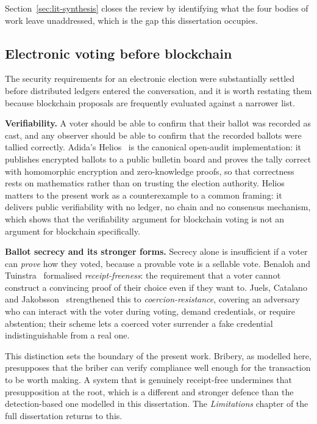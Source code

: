 Section~\ref{sec:lit-synthesis} closes the review by identifying what
the four bodies of work leave unaddressed, which is the gap this
dissertation occupies.

\subsection{Electronic voting before blockchain}
\label{sec:lit-evoting}

The security requirements for an electronic election were substantially
settled before distributed ledgers entered the conversation, and it is
worth restating them because blockchain proposals are frequently
evaluated against a narrower list.

\textbf{Verifiability.} A voter should be able to confirm that their
ballot was recorded as cast, and any observer should be able to confirm
that the recorded ballots were tallied correctly. Adida's
Helios~\cite{adida2008} is the canonical open-audit implementation: it
publishes encrypted ballots to a public bulletin board and proves the
tally correct with homomorphic encryption and zero-knowledge proofs, so
that correctness rests on mathematics rather than on trusting the
election authority. Helios matters to the present work as a
counterexample to a common framing: it delivers public verifiability
with no ledger, no chain and no consensus mechanism, which shows that
the verifiability argument for blockchain voting is not an argument for
blockchain specifically.

\textbf{Ballot secrecy and its stronger forms.} Secrecy alone is
insufficient if a voter can \emph{prove} how they voted, because a
provable vote is a sellable vote. Benaloh and
Tuinstra~\cite{benaloh1994} formalised \emph{receipt-freeness}: the
requirement that a voter cannot construct a convincing proof of their
choice even if they want to. Juels, Catalano and
Jakobsson~\cite{juels2005} strengthened this to
\emph{coercion-resistance}, covering an adversary who can interact with
the voter during voting, demand credentials, or require abstention;
their scheme lets a coerced voter surrender a fake credential
indistinguishable from a real one.

This distinction sets the boundary of the present work. Bribery, as
modelled here, presupposes that the briber can verify compliance well
enough for the transaction to be worth making. A system that is
genuinely receipt-free undermines that presupposition at the root,
which is a different and stronger defence than the detection-based one
modelled in this dissertation. The \emph{Limitations} chapter of the full dissertation returns to this.

